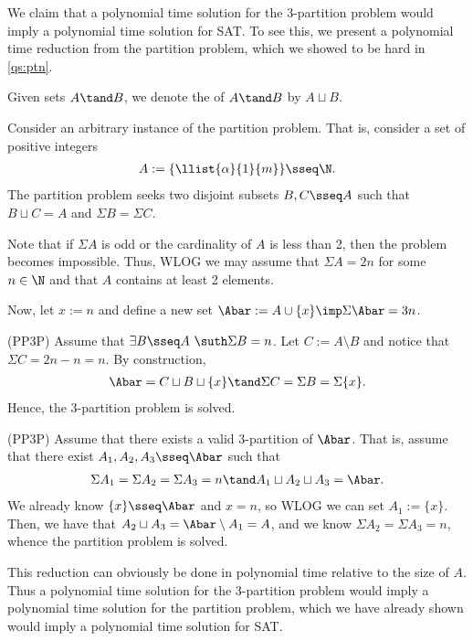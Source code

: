\documentclass{article}
\begin{document}
\begin{solution}
  We claim that a polynomial time solution for the 3-partition problem would imply a polynomial time solution for SAT.
  To see this, we present a polynomial time reduction from the partition problem, which we showed to be hard in \ref{qs:ptn}.

  \begin{notation}
  Given sets \( A \tand B \), we denote the  of \( A\tand B \) by \( A\sqcup B \).
  \end{notation}

  Consider an arbitrary instance of the partition problem.
  That is, consider a set of positive integers \begin{align*}
    A := \{\llist{\alpha}{1}{m}\} \sseq \N.
  \end{align*}
  The partition problem seeks two disjoint subsets \( B,C\sseq A \) such that \( B\sqcup C = A \) and \( \Sigma B = \Sigma C \).

  Note that if \( \Sigma A \) is odd or the cardinality of \( A \) is less than 2, then the problem becomes impossible.
  Thus, WLOG we may assume that \( \Sigma A = 2n \) for some \( n\in \N \) and that \( A \) contains at least 2 elements.

  Now, let \( x := n \) and define a new set \( \Abar := A\cup \{x\}\imp \Sigma \Abar = 3n \).

  \begin{subproof}[Correctness.]
    (PP\imp 3P)
    Assume that \( \exists B\sseq A\ \suth \Sigma B = n \).
    Let \( C := A \setminus B \) and notice that \( \Sigma C = 2n - n = n \).
    By construction,
    \begin{align*}
      \Abar = C\sqcup  B \sqcup \{x\} \tand \Sigma C = \Sigma B = \Sigma \{x\}.
    \end{align*}
    Hence, the 3-partition problem is solved.

    (PP\pmi 3P)
    Assume that there exists a valid 3-partition of \( \Abar \).
    That is, assume that there exist \( A_1, A_2, A_3 \sseq \Abar \) such that \begin{align*}
      \Sigma A_1 = \Sigma A_2 = \Sigma A_3 = n \tand A_1 \sqcup A_2 \sqcup A_3 = \Abar.
    \end{align*}
    We already know \( \{x\}\sseq \Abar \) and \( x=n \), so WLOG we can set \( A_1 := \{x\} \).
    Then, we have that \( A_2 \sqcup A_3 = \Abar \setminus A_1 = A \), and we know \( \Sigma A_2 = \Sigma A_3 = n \), whence the partition problem is solved.
  \end{subproof}
  This reduction can obviously be done in polynomial time relative to the size of \( A \).
  Thus a polynomial time solution for the 3-partition problem would imply a polynomial time solution for the partition problem, which we have already shown would imply a polynomial time solution for SAT.
\end{solution}
\pagebreak
\end{document}
